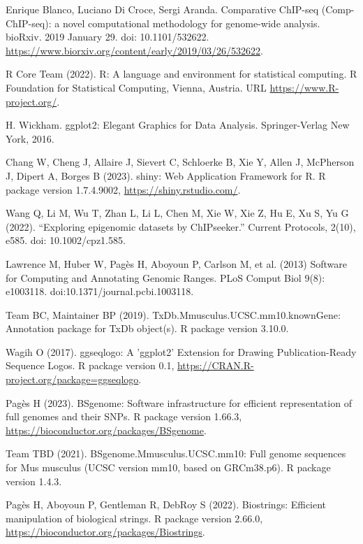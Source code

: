 \documentclass[12pt]{article}
\begin{document}
\begin{thebibliography}{99}
 Enrique Blanco, Luciano Di Croce, Sergi Aranda. Comparative
ChIP-seq (Comp-ChIP-seq): a novel computational methodology for genome-wide
analysis. bioRxiv. 2019 January 29. doi: 10.1101/532622. \newline
\url{https://www.biorxiv.org/content/early/2019/03/26/532622}.

 R Core Team (2022). R: A language and environment for statistical
computing. R Foundation for Statistical Computing, Vienna, Austria. URL
\url{https://www.R-project.org/}.

 H. Wickham. ggplot2: Elegant Graphics for Data Analysis.
Springer-Verlag New York, 2016.

 Chang W, Cheng J, Allaire J, Sievert C, Schloerke B, Xie Y,
Allen J, McPherson J, Dipert A, Borges B (2023). shiny: Web Application
Framework for R. R package version 1.7.4.9002, \url{https://shiny.rstudio.com/}.

 Wang Q, Li M, Wu T, Zhan L, Li L, Chen M, Xie W, Xie Z,
Hu E, Xu S, Yu G (2022). “Exploring epigenomic datasets by ChIPseeker.”
Current Protocols, 2(10), e585. doi: 10.1002/cpz1.585.

 Lawrence M, Huber W, Pag\`es H, Aboyoun P, Carlson M,
et al. (2013) Software for Computing and Annotating Genomic Ranges. PLoS Comput
Biol 9(8): e1003118. doi:10.1371/journal.pcbi.1003118.

 Team BC, Maintainer BP (2019). 
TxDb.Mmusculus.UCSC.mm10.knownGene: Annotation package for TxDb object(s).
R package version 3.10.0.

 Wagih O (2017). ggseqlogo: A 'ggplot2' Extension for
Drawing Publication-Ready Sequence Logos. R package version 0.1, \newline
\url{https://CRAN.R-project.org/package=ggseqlogo}.

 Pagès H (2023). BSgenome: Software infrastructure for
efficient representation of full genomes and their SNPs. R package version
1.66.3, \newline
\url{https://bioconductor.org/packages/BSgenome}.

 Team TBD (2021). BSgenome.Mmusculus.UCSC.mm10: Full
genome sequences for Mus musculus (UCSC version mm10, based on GRCm38.p6). R
package version 1.4.3.

 Pagès H, Aboyoun P, Gentleman R, DebRoy S (2022).
Biostrings: Efficient manipulation of biological strings. R package version
2.66.0, \newline
\url{https://bioconductor.org/packages/Biostrings}.


\end{thebibliography}
\end{document}
